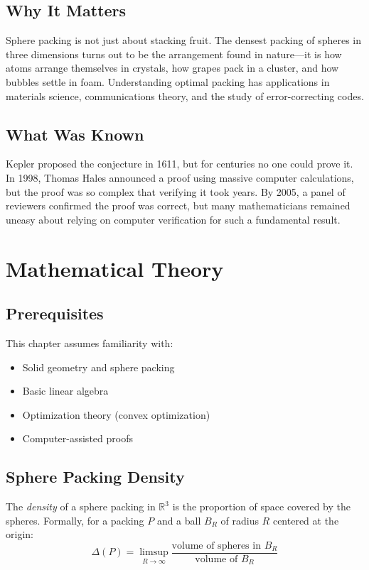 \subsection{Why It Matters}
Sphere packing is not just about stacking fruit. The densest packing of spheres in three dimensions turns out to be the arrangement found in nature---it is how atoms arrange themselves in crystals, how grapes pack in a cluster, and how bubbles settle in foam. Understanding optimal packing has applications in materials science, communications theory, and the study of error-correcting codes.

\subsection{What Was Known}
Kepler proposed the conjecture in 1611, but for centuries no one could prove it. In 1998, Thomas Hales announced a proof using massive computer calculations, but the proof was so complex that verifying it took years. By 2005, a panel of reviewers confirmed the proof was correct, but many mathematicians remained uneasy about relying on computer verification for such a fundamental result.

\section{Mathematical Theory}


\subsection{Prerequisites}
This chapter assumes familiarity with:
\begin{itemize}
\item Solid geometry and sphere packing
\item Basic linear algebra
\item Optimization theory (convex optimization)
\item Computer-assisted proofs
\end{itemize}

\subsection{Sphere Packing Density}

\begin{definition}
The \emph{density} of a sphere packing in $\mathbb{R}^3$ is the proportion of space covered by the spheres. Formally, for a packing $P$ and a ball $B_R$ of radius $R$ centered at the origin:
\[\Delta(P) = \limsup_{R \to \infty} \frac{\text{volume of spheres in } B_R}{\text{volume of } B_R}\]
\end{definition}

